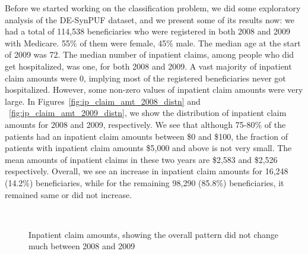 Before we started working on the classification problem, we did some exploratory analysis of the DE-SynPUF dataset, and we present some of its results now: we had a total of 114,538 beneficiaries who were registered in both 2008 and 2009 with Medicare. 55\% of them were female, 45\% male. The median age at the start of 2009 was 72. The median number of inpatient claims, among people who did get hospitalized, was one, for both 2008 and 2009. A vast majority of inpatient claim amounts were 0, implying most of the registered beneficiaries never got hospitalized. However, some non-zero values of inpatient claim amounts were very large. In Figures~\ref{fig:ip_claim_amt_2008_distn} and ~\ref{fig:ip_claim_amt_2009_distn}, we show the distribution of inpatient claim amounts for 2008 and 2009, respectively. We see that although 75-80\% of the patients had an inpatient claim amounts between \$0 and \$100, the fraction of patients with inpatient claim amounts \$5,000 and above is not very small. The mean amounts of inpatient claims in these two years are \$2,583 and \$2,526 respectively. Overall, we see an increase in inpatient claim amounts for 16,248 (14.2\%) beneficiaries, while for the remaining 98,290 (85.8\%) beneficiaries, it remained same or did not increase.


\begin{figure}[!h]
\centering
{}\\
\caption{\small Inpatient claim amounts, showing the overall pattern did not change much between 2008 and 2009}
\end{figure}
